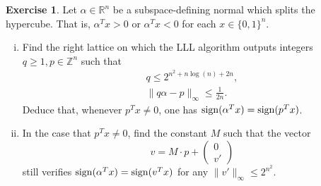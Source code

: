 \documentclass[12pt,a4paper]{article}
\theoremstyle{plain}
\newtheorem*{Sol*}{Solution}
\theoremstyle{definition}
\newtheorem{Ex}{Exercise}
\def \R {\mathbb R}
\def \Z {\mathbb Z}
\newif\ifsolutions
\newcommand{\exercise}[2]{
			\begin{Ex} #1 \end{Ex}
			\ifsolutions  \begin{Sol*} #2 \end{Sol*} \bigskip \else \bigskip  \fi
		}
\begin{document}
\exercise{
	Let $\alpha \in \R^n$ be a subspace-defining normal which splits the hypercube.
	That is, $\alpha^T x > 0$ or $\alpha^T x < 0$ for each $x \in \{0,1\}^n$.

	\begin{enumerate}[i)]
		\item Find the right lattice on which the LLL algorithm outputs integers $q \geq 1, p \in \Z^n$ such that
		\begin{gather*}
			q \leq 2^{n^2 + n \log(n) + 2n}, \\
			\| q \alpha - p \|_\infty \leq \frac{1}{2n}.
		\end{gather*}
		Deduce that, whenever $p^T x \neq 0$, one has ${\rm sign}(\alpha^T x) = {\rm sign}(p^Tx)$.
		
		\item
		In the case that $p^T x \neq 0$, find the constant $M$ such that the vector
			\[ v = M\cdot p + \begin{pmatrix}0 \\ v' \end{pmatrix} \]
		still verifies ${\rm sign}(\alpha^T x) = {\rm sign}(v^Tx)$ for any $\| v' \|_\infty \leq 2^{n^2}$.
	\end{enumerate}
}
{}
\end{document}
